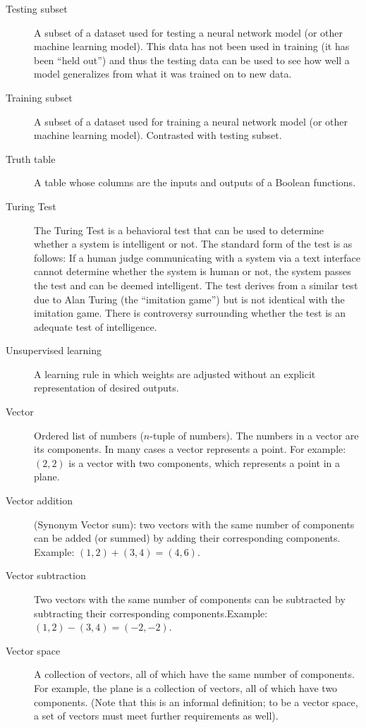 \begin{description}
\item[Testing subset] A subset of a dataset used for testing a neural network model (or other machine learning model). This data has not been used in training (it has been ``held out'') and thus the testing data can be used to see how well a model generalizes from what it was trained on to new data.

\item[Training subset] A subset of a dataset used for training a neural network model (or other machine learning model). Contrasted with testing subset.

\item[Truth table] A table whose columns are the inputs and outputs of a Boolean functions.

\item[Turing Test] The Turing Test is a behavioral test that can be used to determine whether a system is intelligent or not. The standard form of the test is as follows: If a human judge communicating with a system via a text interface cannot determine whether the system is human or not, the system passes the test and can be deemed intelligent.  The test derives from a similar test due to Alan Turing (the ``imitation game'') but is not identical with the imitation game. There is controversy surrounding whether the test is an adequate test of intelligence.

\item[Unsupervised learning] A learning rule in which weights are adjusted without an explicit representation of desired outputs.

\item[Vector] Ordered list of numbers ($n$-tuple of numbers). The numbers in a vector are its components. In many cases a vector represents a point. For example: $(2,2)$ is a vector with two components, which represents a point in a plane.

\item[Vector addition] (Synonym Vector sum): two vectors with the same number of components can be added (or summed) by adding their corresponding components. Example: $(1,2) + (3,4) = (4,6)$.

\item[Vector subtraction] Two vectors with the same number of components can be subtracted by subtracting their corresponding components.Example: $(1,2) - (3,4) = (-2,-2)$.

\item[Vector space] A collection of vectors, all of which have the same number of components. For example, the plane is a collection of vectors, all of which have two components. (Note that this is an  informal definition; to be a vector space, a set of vectors must meet further requirements as well).


\end{description}
